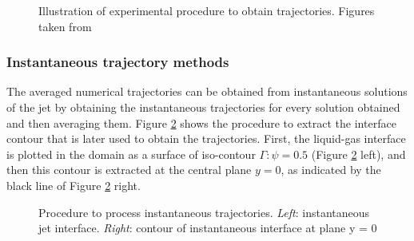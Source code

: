 \begin{figure}[ht]
     \centering
     \caption{Illustration of experimental procedure to obtain trajectories. Figures taken from }
      \label{fig:expe_obtention_of_trajectories}
\end{figure}


\subsubsection{Instantaneous trajectory methods}

The averaged numerical trajectories can be obtained from instantaneous solutions of the jet by obtaining the instantaneous trajectories for every solution obtained and then averaging them. Figure \ref{fig:trajectory_obtention_instantaneous_general} shows the procedure to extract the interface contour that is later used to obtain the trajectories. First, the liquid-gas interface is plotted in the domain as a surface of iso-contour $\Gamma: \psi = 0.5$ (Figure \ref{fig:trajectory_obtention_instantaneous_general} left), and then this contour is extracted at the central plane $y = 0$, as indicated by the black line of Figure \ref{fig:trajectory_obtention_instantaneous_general} right. 

\begin{figure}[ht]
     \centering
     \begin{subfigure}[b]{0.45\textwidth}
         \centering
     \end{subfigure}
     \begin{subfigure}[b]{0.45\textwidth}
         \centering
     \end{subfigure}
        \caption[Procedure to obtain instantaneous trajectories.]{Procedure to process instantaneous trajectories. \textsl{Left}: instantaneous jet interface. \textsl{Right}: contour of instantaneous interface at plane y = 0}
        \label{fig:trajectory_obtention_instantaneous_general}
\end{figure}

